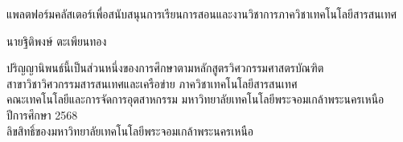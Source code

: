 \newpage
\thispagestyle{empty}
\begin{center}


แพลตฟอร์มคลัสเตอร์เพื่อสนับสนุนการเรียนการสอนและงานวิชาการภาควิชาเทคโนโลยีสารสนเทศ     %


\vspace{90mm}
นายฐิติพงษ์ ตะเพียนทอง %
\vspace{94mm}   





ปริญญานิพนธ์นี้เป็นส่วนหนึ่งของการศึกษาตามหลักสูตรวิศวกรรมศาสตรบัณฑิต\\
สาขาวิชาวิศวกรรมสารสนเทศและเครือข่าย ภาควิชาเทคโนโลยีสารสนเทศ\\

คณะเทคโนโลยีและการจัดการอุตสาหกรรม มหาวิทยาลัยเทคโนโลยีพระจอมเกล้าพระนครเหนือ\\
ปีการศึกษา 2568\\
ลิขสิทธิ์ของมหาวิทยาลัยเทคโนโลยีพระจอมเกล้าพระนครเหนือ

\end{center}


